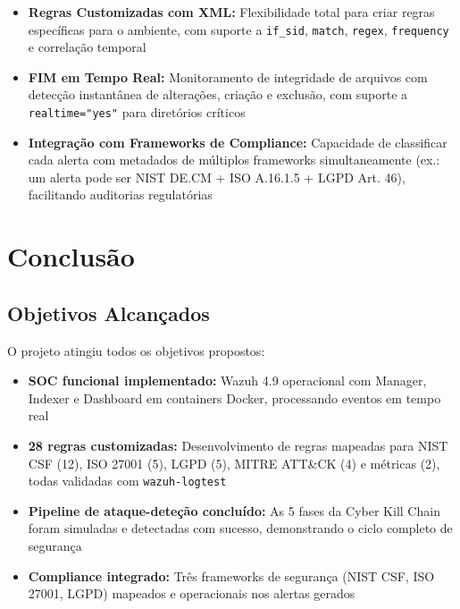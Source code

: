 \documentclass[12pt,a4paper]{article}
\begin{document}
    \begin{itemize}
        \item \textbf{Regras Customizadas com XML:} Flexibilidade total para criar regras específicas para o ambiente, com suporte a \texttt{if\_sid}, \texttt{match}, \texttt{regex}, \texttt{frequency} e correlação temporal
        \item \textbf{FIM em Tempo Real:} Monitoramento de integridade de arquivos com detecção instantânea de alterações, criação e exclusão, com suporte a \texttt{realtime="yes"} para diretórios críticos
        \item \textbf{Integração com Frameworks de Compliance:} Capacidade de classificar cada alerta com metadados de múltiplos frameworks simultaneamente (ex.: um alerta pode ser NIST DE.CM + ISO A.16.1.5 + LGPD Art. 46), facilitando auditorias regulatórias
    \end{itemize}

    \newpage
    \section{Conclusão}

    \subsection{Objetivos Alcançados}

    O projeto atingiu todos os objetivos propostos:

    \begin{itemize}
        \item \textbf{SOC funcional implementado:} Wazuh 4.9 operacional com Manager, Indexer e Dashboard em containers Docker, processando eventos em tempo real
        \item \textbf{28 regras customizadas:} Desenvolvimento de regras mapeadas para NIST CSF (12), ISO 27001 (5), LGPD (5), MITRE ATT\&CK (4) e métricas (2), todas validadas com \texttt{wazuh-logtest}
        \item \textbf{Pipeline de ataque-deteção concluído:} As 5 fases da Cyber Kill Chain foram simuladas e detectadas com sucesso, demonstrando o ciclo completo de segurança
        \item \textbf{Compliance integrado:} Três frameworks de segurança (NIST CSF, ISO 27001, LGPD) mapeados e operacionais nos alertas gerados
    \end{itemize}
\end{document}
